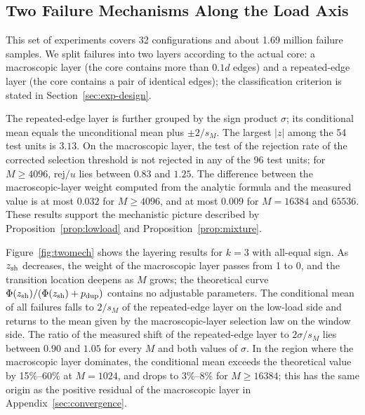 \subsection{Two Failure Mechanisms Along the Load Axis}\label{sec:num-loadaxis}
This set of experiments covers 32 configurations and about 1.69 million failure samples. We split failures into two
layers according to the actual core: a macroscopic layer (the core contains more than $0.1d$ edges) and a
repeated-edge layer (the core contains a pair of identical edges); the classification criterion is stated in
Section~\ref{sec:exp-design}.

The repeated-edge layer is further grouped by the sign product $\sigma$; its conditional mean equals the
unconditional mean plus $\pm2/s_M$. The largest $|z|$ among the 54 test units is $3.13$. On the macroscopic layer,
the test of the rejection rate of the corrected selection threshold is not rejected in any of the 96 test units; for
$M\ge4096$, rej$/u$ lies between $0.83$ and $1.25$.
The difference between the macroscopic-layer weight computed from the analytic formula and the measured value is at
most $0.032$ for $M\ge4096$, and at most $0.009$ for $M=16384$ and $65536$. These results support the mechanistic
picture described by Proposition~\ref{prop:lowload} and Proposition~\ref{prop:mixture}.

Figure~\ref{fig:twomech} shows the layering results for $k=3$ with all-equal sign. As $z_{\rm sh}$ decreases, the
weight of the macroscopic layer passes from 1 to 0, and the transition location deepens as $M$ grows; the theoretical
curve $\Phi(z_{\rm sh})/(\Phi(z_{\rm sh})+p_{\rm dup})$ contains no adjustable parameters. The
conditional mean of all failures falls to $2/s_M$ of the repeated-edge layer on the low-load side and returns to the
mean given by the macroscopic-layer selection law on the window side.
The ratio of the measured shift of the repeated-edge layer to $2\sigma/s_M$ lies between $0.90$ and $1.05$ for every
$M$ and both values of $\sigma$.
In the region where the macroscopic layer dominates, the conditional mean exceeds the theoretical value by
15\%--60\% at $M=1024$, and drops to 3\%--8\% for $M\ge16384$; this has the same origin as the positive residual of
the macroscopic layer in Appendix~\ref{sec:convergence}.

